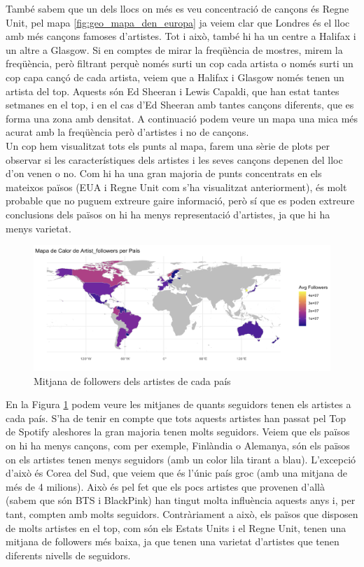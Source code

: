 També sabem que un dels llocs on més es veu concentració de cançons és Regne Unit, pel mapa \ref{fig:geo_mapa_den_europa} ja veiem clar que Londres és el lloc amb més cançons famoses d'artistes. Tot i això, també hi ha un centre a Halifax i un altre a Glasgow. Si en comptes de mirar la freqüència de mostres, mirem la freqüència, però filtrant perquè només surti un cop cada artista o només surti un cop capa cançó de cada artista, veiem que a Halifax i Glasgow només tenen un artista del top. Aquests són Ed Sheeran i Lewis Capaldi, que han estat tantes setmanes en el top, i en el cas d'Ed Sheeran amb tantes cançons diferents, que es forma una zona amb densitat. A continuació podem veure un mapa una mica més acurat amb la freqüència però d'artistes i no de cançons. \\

Un cop hem visualitzat tots els punts al mapa, farem una sèrie de plots per observar si les característiques dels artistes i les seves cançons depenen del lloc d'on venen o no. Com hi ha una gran majoria de punts concentrats en els mateixos països (EUA i Regne Unit com s'ha visualitzat anteriorment), és molt probable que no puguem extreure gaire informació, però sí que es poden extreure conclusions dels països on hi ha menys representació d'artistes, ja que hi ha menys varietat.

\begin{figure}[H]
    \centering
    \includegraphics[width=0.8\linewidth]{Images/7_Geospatial/1_descriptive/mapa_artist_followers.png}
    \caption{Mitjana de followers dels artistes de cada país}
    \label{fig:geo_mean_follow}
\end{figure}

En la Figura \ref{fig:geo_mean_follow} podem veure les mitjanes de quants seguidors tenen els artistes a cada país. S'ha de tenir en compte que tots aquests artistes han passat pel Top de Spotify aleshores la gran majoria tenen molts seguidors. Veiem que els països on hi ha menys cançons, com per exemple, Finlàndia o Alemanya, són els països on els artistes tenen menys seguidors (amb un color lila tirant a blau). L'excepció d'això és Corea del Sud, que veiem que és l'únic país groc (amb una mitjana de més de 4 milions). Això és pel fet que els pocs artistes que provenen d'allà (sabem que són BTS i BlackPink) han tingut molta influència aquests anys i, per tant, compten amb molts seguidors. Contràriament a això, els països que disposen de molts artistes en el top, com són els Estats Units i el Regne Unit, tenen una mitjana de followers més baixa, ja que tenen una varietat d'artistes que tenen diferents nivells de seguidors.


